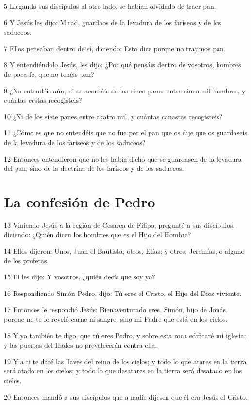 \par 5 Llegando sus discípulos al otro lado, se habían olvidado de traer pan.
\par 6 Y Jesús les dijo: Mirad, guardaos de la levadura de los fariseos y de los saduceos.
\par 7 Ellos pensaban dentro de sí, diciendo: Esto dice porque no trajimos pan.
\par 8 Y entendiéndolo Jesús, les dijo: ¿Por qué pensáis dentro de vosotros, hombres de poca fe, que no tenéis pan?
\par 9 ¿No entendéis aún, ni os acordáis de los cinco panes entre cinco mil hombres, y cuántas cestas recogisteis?
\par 10 ¿Ni de los siete panes entre cuatro mil, y cuántas canastas recogisteis?
\par 11 ¿Cómo es que no entendéis que no fue por el pan que os dije que os guardaseis de la levadura de los fariseos y de los saduceos?
\par 12 Entonces entendieron que no les había dicho que se guardasen de la levadura del pan, sino de la doctrina de los fariseos y de los saduceos.

\section*{La confesión de Pedro}

\par 13 Viniendo Jesús a la región de Cesarea de Filipo, preguntó a sus discípulos, diciendo: ¿Quién dicen los hombres que es el Hijo del Hombre?
\par 14 Ellos dijeron: Unos, Juan el Bautista; otros, Elías; y otros, Jeremías, o alguno de los profetas.
\par 15 El les dijo: Y vosotros, ¿quién decís que soy yo?
\par 16 Respondiendo Simón Pedro, dijo: Tú eres el Cristo, el Hijo del Dios viviente.
\par 17 Entonces le respondió Jesús: Bienaventurado eres, Simón, hijo de Jonás, porque no te lo reveló carne ni sangre, sino mi Padre que está en los cielos.
\par 18 Y yo también te digo, que tú eres Pedro, y sobre esta roca edificaré mi iglesia; y las puertas del Hades no prevalecerán contra ella.
\par 19 Y a ti te daré las llaves del reino de los cielos; y todo lo que atares en la tierra será atado en los cielos; y todo lo que desatares en la tierra será desatado en los cielos.
\par 20 Entonces mandó a sus discípulos que a nadie dijesen que él era Jesús el Cristo.

